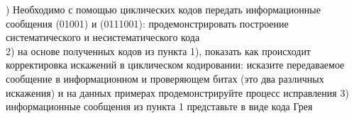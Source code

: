 
) Необходимо с помощью циклических кодов  передать  информационные сообщения (01001) и (0111001): продемонстрировать построение систематического и несистематического кода \\
2) на основе полученных кодов из пункта 1), показать как происходит корректировка искажений в циклическом кодировании: исказите передаваемое сообщение в информационном и проверяющем битах (это два различных искажения) и на данных примерах продемонстрируйте процесс исправления 
3) информационные сообщения из пункта 1 представьте в виде кода Грея

